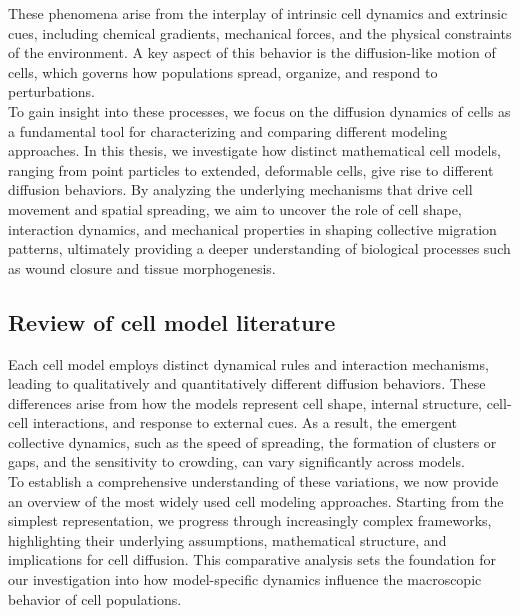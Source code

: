 These phenomena arise from the interplay of intrinsic cell dynamics and extrinsic cues, including chemical gradients, mechanical forces, and the physical constraints of the environment. 
A key aspect of this behavior is the diffusion-like motion of cells, which governs how populations spread, organize, and respond to perturbations. \\
To gain insight into these processes, we focus on the diffusion dynamics of cells as a fundamental tool for characterizing and comparing different modeling approaches. 
In this thesis, we investigate how distinct mathematical cell models, ranging from point particles to extended, deformable cells, give rise to different diffusion behaviors. 
By analyzing the underlying mechanisms that drive cell movement and spatial spreading, we aim to uncover the role of cell shape, interaction dynamics, and mechanical properties in shaping collective migration patterns, ultimately providing a deeper understanding of biological processes such as wound closure and tissue morphogenesis. \\

\subsection{Review of cell model literature} 
Each cell model employs distinct dynamical rules and interaction mechanisms, leading to qualitatively and quantitatively different diffusion behaviors. 
These differences arise from how the models represent cell shape, internal structure, cell-cell interactions, and response to external cues. 
As a result, the emergent collective dynamics, such as the speed of spreading, the formation of clusters or gaps, and the sensitivity to crowding, can vary significantly across models. \\
To establish a comprehensive understanding of these variations, we now provide an overview of the most widely used cell modeling approaches. 
Starting from the simplest representation, we progress through increasingly complex frameworks, highlighting their underlying assumptions, mathematical structure, and implications for cell diffusion. 
This comparative analysis sets the foundation for our investigation into how model-specific dynamics influence the macroscopic behavior of cell populations. \\

